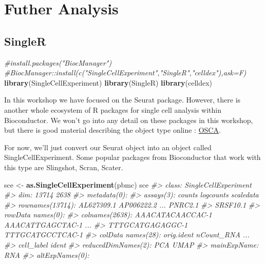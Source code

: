 \documentclass[
]{book}
\newenvironment{Shaded}{\begin{snugshade}}{\end{snugshade}}
\newcommand{\CommentTok}[1]{\textcolor[rgb]{0.56,0.35,0.01}{\textit{#1}}}
\newcommand{\FunctionTok}[1]{\textcolor[rgb]{0.13,0.29,0.53}{\textbf{#1}}}
\newcommand{\NormalTok}[1]{#1}
\newcommand{\OtherTok}[1]{\textcolor[rgb]{0.56,0.35,0.01}{#1}}
\begin{document}
\hypertarget{part-futher-analysis}{%
\part{Futher Analysis}\label{part-futher-analysis}}

\hypertarget{singler}{%
\chapter{SingleR}\label{singler}}

\begin{Shaded}
\begin{Highlighting}[]
\CommentTok{\#install.packages("BiocManager")}
\CommentTok{\#BiocManager::install(c("SingleCellExperiment","SingleR","celldex"),ask=F)}
\FunctionTok{library}\NormalTok{(SingleCellExperiment)}
\FunctionTok{library}\NormalTok{(SingleR)}
\FunctionTok{library}\NormalTok{(celldex)}
\end{Highlighting}
\end{Shaded}

In this workshop we have focused on the Seurat package. However, there is another whole ecosystem of R packages for single cell analysis within Bioconductor. We won't go into any detail on these packages in this workshop, but there is good material describing the object type online : \href{https://robertamezquita.github.io/orchestratingSingleCellAnalysis/data-infrastructure.html}{OSCA}.

For now, we'll just convert our Seurat object into an object called SingleCellExperiment. Some popular packages from Bioconductor that work with this type are Slingshot, Scran, Scater.

\begin{Shaded}
\begin{Highlighting}[]
\NormalTok{sce }\OtherTok{\textless{}{-}} \FunctionTok{as.SingleCellExperiment}\NormalTok{(pbmc)}
\NormalTok{sce}
\CommentTok{\#\textgreater{} class: SingleCellExperiment }
\CommentTok{\#\textgreater{} dim: 13714 2638 }
\CommentTok{\#\textgreater{} metadata(0):}
\CommentTok{\#\textgreater{} assays(3): counts logcounts scaledata}
\CommentTok{\#\textgreater{} rownames(13714): AL627309.1 AP006222.2 ... PNRC2.1}
\CommentTok{\#\textgreater{}   SRSF10.1}
\CommentTok{\#\textgreater{} rowData names(0):}
\CommentTok{\#\textgreater{} colnames(2638): AAACATACAACCAC{-}1 AAACATTGAGCTAC{-}1 ...}
\CommentTok{\#\textgreater{}   TTTGCATGAGAGGC{-}1 TTTGCATGCCTCAC{-}1}
\CommentTok{\#\textgreater{} colData names(28): orig.ident nCount\_RNA ...}
\CommentTok{\#\textgreater{}   cell\_label ident}
\CommentTok{\#\textgreater{} reducedDimNames(2): PCA UMAP}
\CommentTok{\#\textgreater{} mainExpName: RNA}
\CommentTok{\#\textgreater{} altExpNames(0):}
\end{Highlighting}
\end{Shaded}
\end{document}
